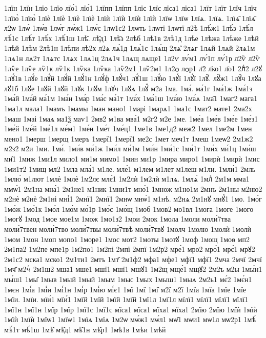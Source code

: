 {1лїн
1лїн
1лїо
1лїо
лїо́1
лїо́1
1лїпп
1лїпп
1лїс
1лїс
лїса1
лїса1
1лїт
1лїт
1лїч
1лїч
1лїю̀
1лїю̀
1лїѐ
1лїѐ
1лїѐ
1лїѐ
1лїѝ
1лїѝ
1лїѝ
1лїѝ
1лїѡ
1лїѡ
1лїѧ.
1лїѧ.
1лїѧ̑
1лїѧ̑
л2ѡ
1лѡ̀
1лѡ́в
1лѡ́г
лѡ́ж1
1лѡ́с
1лѡ1с2
1лѡть
1лѡтї
1лѡтї
л2ѣ
1лѣ́ж1
1лѣ́з
1лѣ́л
лѣ́1с
1лѣ́т
1лѣ́х
1лѣ́1ш
1лѣ̑.
лѣ̑д1
1лѣ̑з
2лѣб
1лѣ1в
2лѣ1д
1лѣе
1лѣжа
1лѣже
1лѣй
1лѣй
1лѣм
2лѣ1н
1лѣпи
лѣ2х
л2ѧ
лѧ́1д
1лѧ́1с
1лѧ́щ
2лѧ̑
2лѧг
1лѧй
1лѧй
2лѧ1м
1лѧ1н
лѧ2т
1лѧтс
1лѧх
1лѧ1ц
2лѧ1ч
1лѧщ
лѧще1
1л2ѵ
лѵ́м1
лѵ́1п
лѵ́1р
л2ѷ
л2ѷ
1лѷе
1лѷе
лѷ1к
лѷ1к
1лѷка
1лѷка
1лѷ2м1
1лѷ2м1
1л2ѻ
лѻр1
л҃2
л҃ко1
л҃о1
2лⷣ2
л2ꙋ
1лꙋ́1в
1лꙋ́е
1лꙋ́й
1лꙋ́й
1лꙋ́1н
1лꙋ́ф
1лꙋ́ч1
лꙋ́1ш
1лꙋ́ю
1лꙋ́ї
1лꙋ́ї
1лꙋ̑.
лꙋ̑ж1
1лꙋ̑ч
1лꙋа
лꙋ1б
1лꙋе
1лꙋй
1лꙋй
1лꙋк
1лꙋм
1лꙋч
1лꙋѧ
1лꙋⷩ
м2а
1ма.
1ма́.
ма́1г
1ма́1ж
1ма́1з
1ма́й
1ма́й
ма́1м
1ма́н
1ма́р
1ма́с
ма́1т
1ма́х
1ма́1ш
1ма́ю
1ма́ѧ
1ма̑1
1маг2
мага1
1ма1л
мала1
1мамъ
1мамы
1ман
мано1
1марі
1марѧ1
1ма1с
1мат2
мате1
2ма2х
1маш
1маі
1маѧ
ма1ѯ
маѵ1
2мв2
м1ва
мва́1
м2г2
м2е
1ме.
1ме́а
1ме́в
1ме́е
1ме́з1
1ме́й
1ме́й
1ме́1л
ме́м1
1ме́н
1ме́т
1ме́ц1
1ме1в
1ме1д2
меж2
1мел
1ме2м
1мен
мено1
1мерш
1мерщ
1меръ
1мерї1
1мерї1
ме2с
1мет
меч1т
1меш
1меѡ2
2м1ж2
м2з2
м2и
1ми.
1ми́.
1ми́в
ми́1ж
1ми́л
ми́1м
1ми́н
1ми́1с
1ми́1т
1ми́х
ми́1ц
1ми́ш
ми̑1
1миж
1ми1л
мило1
ми1м
мимо1
1мин
ми1р
1мира
миро1
1мирѝ
1мирѝ
1мис
1ми1т2
1мищ
мл2
1мла
мла́1
м1ле.
мле́1
м1лем
м1лет
м1леш
м1ли.
1мли́1
2мль
1млю̀
м1лют
1млѐ
1млѐ
1м2лє
млє́1
1м2лѝ
1м2лѝ
м1лѧ.
1млѧ̀
1млⷭ
2м1м
мма1
ммѡ́1
2м1на
мна́1
2м1не1
м1ник
1мни1т
мно́1
1множ
м1но1м
2мнъ
2м1ны
м2ню2
м2нѐ
м2нѐ
2м1ні
мні́1
2мнї1
2мнї1
2мнѡ
мнѡ́1
м1нѣ.
м2нѧ
2м1нꙋ
мнꙋ́1
1мо.
1мо́г
1мо́ж
1мо́1к
1мо́л
1мо́м
мо́1р
1мо́с
1мо́щ
1моб
1мов2
мо1вл
1мога
1моге
1мого
1могꙋ
1мод
1мое
мое1м
1мож
1мо1з2
1мои
2мок
1мола
1моли
моли́7тва
моли́7твен
моли́7тво
моли́7твы
моли́7твѣ
моли́7твꙋ
1молч
1молю
1молѝ
1молѝ
1мом
1мон
1моп
мопо1
1море1
1мос
мот2
1моты
1мотꙋ
1моф
1мощ
1моѳ
мп2
2м1па2
1м2пе
мпе1р
1м2по1
1м2пі
2мпї
2мпї
1м2р2
мре́1
мро2
мро́1
мрє́1
мрꙋ2
2м1с2
мска1
мско1
2м1ти1
2мтъ
1мт҃
2м1ф2
мфа1
мфе1
мфї1
мфї1
2мча
2мчї
2мчї
1мч҃
м2чⷭ
2м1ш2
мша1
мше1
мшї1
мшї1
мшꙋ1
1м2щ
мще́1
мщꙋ2
2м2ъ
м2ы
1мы́н1
мы́ш1
1мы̑
1мыв
1мый
1мый
1мым
1мыс
1мых
1мыш1
1мыѧ
2м2ь1
мє́2
1мє́н1
1мєн
1мі́а
1мі́и
1мі́1н
1мі́р
1мі́ю
мі́є1
1мї
1мї
1мі̑
м2ї
м2ї
1мїа
1мїа
1мїе
1мїе
1мїи.
1мїи.
мїи́1
мїи́1
1мїй
1мїй
1мїй
1мїй
1мї1л
1мї1л
мїлї1
мїлї1
мїлї1
мїлї1
1мї1н
1мї1н
1мїр
1мїр
1мї1с
1мї1с
мїса1
мїса1
мїха1
мїха1
2мїю
2мїю
1мїѝ
1мїѝ
1мїѝ
1мїѝ
1мїѡ1
1мїѡ1
1мїѧ
1мїѧ
1м2ѡ
мѡ́ж1
мѡ́л1
мѡ̑1
мѡи1
мѡ1л
мѡ2р1
1мѣ́
мѣ́1т
мѣ́1ш
1мѣ̑
мѣ̑д1
мѣ̑1н
мѣ̑р1
1мѣ1в
1мѣи
1мѣй
}
